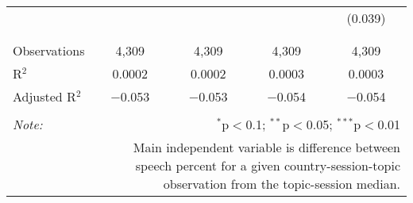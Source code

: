 \begin{table}[!htbp]
\begin{tabular}{@{\extracolsep{5pt}}lcccc}
  &  &  &  & (0.039) \\ 
  & & & & \\ 
\hline \\[-1.8ex] 
Observations & 4,309 & 4,309 & 4,309 & 4,309 \\ 
R$^{2}$ & 0.0002 & 0.0002 & 0.0003 & 0.0003 \\ 
Adjusted R$^{2}$ & $-$0.053 & $-$0.053 & $-$0.054 & $-$0.054 \\ 
\hline 
\hline \\[-1.8ex] 
\textit{Note:}  & \multicolumn{4}{r}{$^{*}$p$<$0.1; $^{**}$p$<$0.05; $^{***}$p$<$0.01} \\ 
 & \multicolumn{4}{r}{Main independent variable is difference between speech percent for a given country-session-topic observation from the topic-session median.} \\ 
\end{tabular} 
\end{table} 
